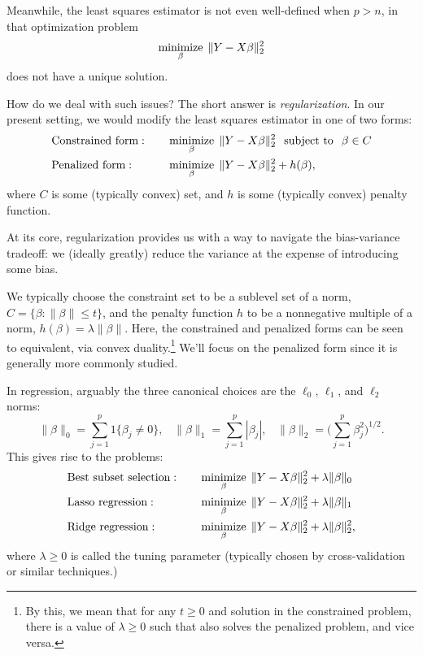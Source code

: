 \documentclass{article}
\begin{document}
Meanwhile, the least squares estimator is not even well-defined when $p > n$, in
that optimization problem 
\[
\mathop{\mathrm{minimize}}_\beta \; \|Y - X\beta\|_2^2 
\] 
does not have a unique solution.  

How do we deal with such issues? The short answer is \emph{regularization}. In
our present setting, we would modify the least squares estimator in one of two
forms: 
\begin{alignat*}{3}
&\text{Constrained form}: \quad 
&&\mathop{\mathrm{minimize}}_\beta \; \|Y - X\beta\|_2^2 \;\; \mathop{\mathrm{subject\,\,to}} \;\; \beta \in C \\
&\text{Penalized form}: \quad 
&&\mathop{\mathrm{minimize}}_\beta \; \|Y - X\beta\|_2^2 + h(\beta),
\end{alignat*}
where $C$ is some (typically convex) set, and $h$ is some (typically convex)
penalty function.

At its core, regularization provides us with a way to navigate the
bias-variance tradeoff: we (ideally greatly) reduce the variance at the expense
of introducing some bias. 

We typically choose the constraint set to be a sublevel set of a norm, $C =
\{\beta : \|\beta\| \leq t\}$, and the penalty function $h$ to be a nonnegative
multiple of a norm, $h(\beta) = \lambda \|\beta\|$. Here, the constrained and
penalized forms can be seen to equivalent, via convex duality.\footnote{By this,
  we mean that for any $t \geq 0$ and solution \smash{$\hbeta$} in the
  constrained problem, there is a value of $\lambda \geq 0$ such that
  \smash{$\hbeta$} also solves the penalized problem, and vice versa.} 
We'll focus on the penalized form since it is generally more commonly studied.  

In regression, arguably the three canonical choices are the $\ell_0$, $\ell_1$,
and $\ell_2$ norms: 
\[
\|\beta\|_0 = \sum_{j=1}^p 1\{\beta_j \not= 0\}, \;\;\;
\|\beta\|_1 = \sum_{j=1}^p |\beta_j|, \;\;\;
\|\beta\|_2 = \bigg(\sum_{j=1}^p \beta_j^2 \bigg)^{1/2}.
\]
This gives rise to the problems: 
\begin{alignat}{3}
\label{eq:subset}
&\text{Best subset selection}: \quad
&&\mathop{\mathrm{minimize}}_\beta \; \|Y - X\beta\|_2^2 + \lambda \|\beta\|_0 \\ 
\label{eq:lasso}
&\text{Lasso regression}: \quad
&&\mathop{\mathrm{minimize}}_\beta \; \|Y - X\beta\|_2^2 + \lambda \|\beta\|_1 \\ 
\label{eq:ridge} 
&\text{Ridge regression}: \quad
&&\mathop{\mathrm{minimize}}_\beta \; \|Y - X\beta\|_2^2 + \lambda \|\beta\|_2^2,
\end{alignat}
where $\lambda \geq 0$ is called the tuning parameter (typically chosen by
cross-validation or similar techniques.)  
\end{document}
